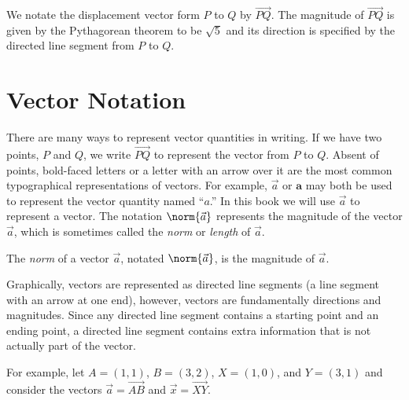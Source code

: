 We notate the displacement vector form $P$ to $Q$ by $\overrightarrow{PQ}$.
The magnitude of $\overrightarrow{PQ}$ is given by the Pythagorean theorem
to be $\sqrt{5}$ and its direction is specified by the directed line segment from
$P$ to $Q$.


\section{Vector Notation}
There are many ways to represent vector quantities in writing.  If
we have two points, $P$ and $Q$, we write $\overrightarrow{PQ}$ to represent the
vector from $P$ to $Q$.  Absent of points, bold-faced letters or a letter
with an arrow over it are the most common typographical representations of vectors.
For example, $\vec a$ or $\mathbf{a}$ may both be used to represent the vector
quantity named ``$a$.''  In this book we will use $\vec a$ to represent a vector.
The notation $\norm{\vec a}$\index{$\norm{\:\cdot\:}$}
represents the magnitude of the vector $\vec a$, which is sometimes called
the \emph{norm} or \emph{length} of $\vec a$.

\begin{definition}[Norm]
	The \emph{norm} of a vector $\vec a$, notated $\norm{\vec a}$, is the
	magnitude of $\vec a$.
\end{definition}

Graphically, vectors are represented as directed line segments (a
line segment with an arrow at one end), however, vectors are fundamentally
directions and magnitudes. Since any directed line segment contains a starting
point and an ending point, a directed line segment contains extra information that
is not actually part of the vector.

\begin{center}
	\usetikzlibrary{patterns,decorations.pathreplacing}
\end{center}

For example, let $A=(1,1)$, $B=(3,2)$, $X=(1,0)$, and $Y=(3,1)$ and consider the vectors
$\vec a = \overrightarrow{AB}$ and $\vec x=\overrightarrow{XY}$.  


